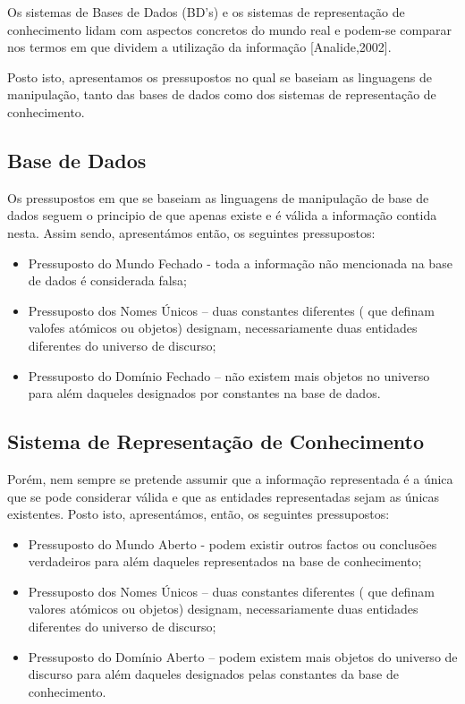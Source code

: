 Os sistemas de Bases de Dados (BD’s) e os sistemas de representação de conhecimento lidam
com aspectos concretos do mundo real e podem-se comparar nos termos em que dividem a
utilização da informação [Analide,2002].

Posto isto, apresentamos os pressupostos no qual se baseiam as linguagens de manipulação,
tanto das bases de dados como dos sistemas de representação de conhecimento.

\subsection{Base de Dados}
Os pressupostos em que se baseiam as linguagens de manipulação de base de dados seguem o principio de que apenas existe e é válida a informação contida nesta. Assim sendo, apresentámos
então, os seguintes pressupostos:

\begin{itemize}
	\item Pressuposto do Mundo Fechado - toda a informação não mencionada na base de dados é considerada falsa;
	\item Pressuposto dos Nomes Únicos – duas constantes diferentes ( que definam valofes atómicos ou objetos) designam, necessariamente duas entidades diferentes do universo de discurso; 
	\item Pressuposto do Domínio Fechado – não existem mais objetos no universo para além daqueles designados por constantes na base de dados.  
\end{itemize}

\subsection{Sistema de Representação de Conhecimento}


Porém, nem sempre se pretende assumir que a informação representada é a única que se pode
considerar válida e que as entidades representadas sejam as únicas existentes. Posto isto, apresentámos, então, os seguintes pressupostos:

\begin{itemize}
	\item Pressuposto do Mundo Aberto - podem existir outros factos ou conclusões verdadeiros para além daqueles representados na base de conhecimento; 
	\item Pressuposto dos Nomes Únicos – duas constantes diferentes ( que definam valores atómicos ou objetos) designam, necessariamente duas entidades diferentes do universo de discurso; 
	\item Pressuposto do Domínio Aberto – podem existem mais objetos do universo de discurso para além daqueles designados pelas constantes da base de conhecimento.  
\end{itemize}

